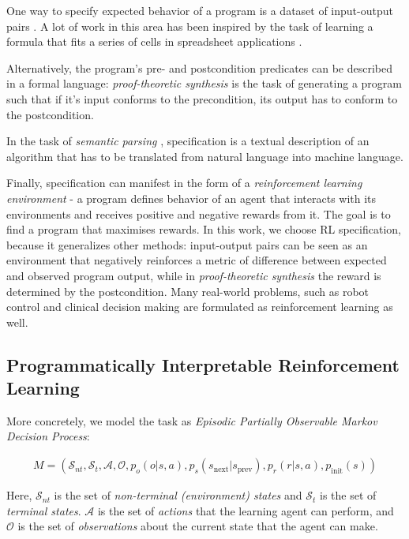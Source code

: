 One way to specify expected behavior of a program is a dataset of input-output pairs \cite{deepcoder,brain-coder}.
A lot of work in this area has been inspired \cite{flashmeta,flash1,flash2} by the task of learning a formula that fits a series of cells in spreadsheet applications \cite{flashfill}.

Alternatively, the program's pre- and postcondition predicates can be described in a formal language: \emph{proof-theoretic synthesis} \cite{prooftheoretic} is the task of generating a program such that if it's input conforms to the precondition, its output has to conform to the postcondition.

In the task of \emph{semantic parsing} \cite{hearthstone,semparsing1,semparsing2}, specification is a textual description of an algorithm that has to be translated from  natural language into machine language.

Finally, specification can manifest in the form of a \emph{reinforcement learning environment} \cite{pirl} - a program defines behavior of an agent that interacts with its environments and receives positive and negative rewards from it.
The goal is to find a program that maximises rewards.
In this work, we choose RL specification, because it generalizes other methods: input-output pairs can be seen as an environment that negatively reinforces a metric of difference between expected and observed program output, while in \emph{proof-theoretic synthesis} the reward is determined by the postcondition.  
Many real-world problems, such as robot control \cite{robotrl} and clinical decision making \cite{heartpole,gym-sepsis} are formulated as reinforcement learning as well.

\subsection{Programmatically Interpretable Reinforcement Learning}
\label{sec:pirl}

More concretely, we model the task as {\em Episodic Partially Observable Markov Decision Process}:

\begin{multline}
M = (\mathcal{S}_{nt}, \mathcal{S}_t, \mathcal{A}, \mathcal{O}, p_o(o | s, a), p_s(s_\text{next} | s_\text{prev}), p_r(r | s, a), p_\text{init}(s))
\end{multline}

Here, $\mathcal{S}_{nt}$ is the set of {\em non-terminal (environment) states} and $\mathcal{S}_{t}$ is the set of {\em terminal states}. 
$\mathcal{A}$ is the set of {\em actions} that the learning agent can perform, and $\mathcal{O}$ is the set of {\em observations} about the current state that the agent can make. 

